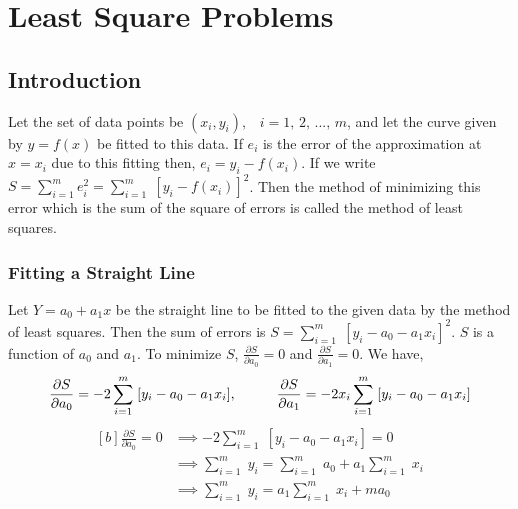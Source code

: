 \documentclass[aima203_lecturenotes_ku.tex]{subfiles}
\begin{document}
\chapter{Least Square Problems}
\section{Introduction}
Let the set of data points be $(x_i,y_i), \;\;\; i=1, \, 2,\, ..., \, m$, and let the curve given by $y=f(x)$ be fitted to this data. If $e_i$ is the error of the approximation at $x=x_i$ due to this fitting then, $e_i= y_i - f(x_i)$. If we write $\displaystyle S= \sum_{i=1} ^ m e_i^2 =  \sum_{i=1} ^ m \; [y_i - f(x_i)]^2$. Then the method of minimizing this error which is the sum of the square of errors is called the method of least squares.

\subsection{Fitting a Straight Line}
Let $Y= a_0 + a_1x$ be the straight line to be fitted to the given data by the method of least squares. Then the sum of errors is $\displaystyle S = \sum_{i=1}^m \; [y_i - a_0 - a_1x_i]^2$. $S$ is a function of $a_0$ and $a_1$. To minimize $S$, $\displaystyle \frac{\partial S}{\partial a_0} = 0$ and $\displaystyle \frac{\partial S}{\partial a_1} = 0 $. We have,
\begin{equation}
  \label{eq:9}
  \begin{gathered}
    \frac{\partial S}{\partial a_0} = -2 \sum_{i=1}^m \; [y_i - a_0 - a_1x_i], \hspace{10mm}
     \frac{\partial S}{\partial a_1} = -2x_i \sum_{i=1}^m \; [y_i - a_0 - a_1x_i]
  \end{gathered}
\end{equation}
\begin{equation}
  \label{singlenormal1}
  \begin{aligned}[b]
  \frac{\partial S}{\partial a_0} = 0 &\implies -2 \sum_{i=1}^m \; [y_i - a_0 - a_1x_i] = 0 \\[1mm]
                                      &\implies \sum_{i=1}^m \; y_i = \sum_{i=1}^m \; a_0 + a_1 \sum_{i=1}^m \;x_i \\[1mm]
                                          &\implies \sum_{i=1}^m \; y_i = a_1 \sum_{i=1}^m \;x_i + ma_0
\end{aligned}
\end{equation}
\end{document}
